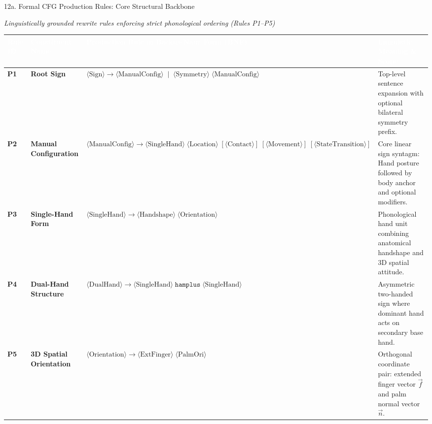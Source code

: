 \documentclass[aspectratio=169,xcolor={table,dvipsnames}]{beamer}
\begin{document}
\begin{frame}[t]{12a. Formal CFG Production Rules: Core Structural Backbone}
\vspace{-0.1cm}
\begin{center}
    \scriptsize\textit{\textcolor{amritaMaroon}{Linguistically grounded rewrite rules enforcing strict phonological ordering (Rules P1--P5)}}
\end{center}

\vspace{-1.5mm}
\centering
\setlength{\tabcolsep}{4pt}
\renewcommand{\arraystretch}{1.28}
{\fontsize{7.2pt}{9.2pt}\selectfont
\begin{tabular}{|>{\centering\arraybackslash\bfseries}p{1.0cm}|>{\raggedright\arraybackslash\bfseries}p{2.6cm}|>{\raggedright\arraybackslash}p{5.8cm}|>{\raggedright\arraybackslash}p{3.2cm}|}
    \hline
    \rowcolor{maroon}
    \textcolor{white}{\textbf{Rule ID}} & 
    \textcolor{white}{\textbf{Constituent Name}} & 
    \textcolor{white}{\textbf{Production Rule in Backus-Naur Form (BNF)}} & 
    \textcolor{white}{\textbf{Linguistic Meaning \& Scope}} \\
    \hline
    \rowcolor{lightblue} 
    \textbf{P1} & Root Sign & 
    $\langle\text{Sign}\rangle \to \langle\text{ManualConfig}\rangle \;\mid\; \langle\text{Symmetry}\rangle \;\langle\text{ManualConfig}\rangle$ & 
    Top-level sentence expansion with optional bilateral symmetry prefix. \\
    \hline
    \rowcolor{lightgreen} 
    \textbf{P2} & Manual Configuration & 
    $\langle\text{ManualConfig}\rangle \to \langle\text{SingleHand}\rangle \;\langle\text{Location}\rangle \;[\langle\text{Contact}\rangle] \;[\langle\text{Movement}\rangle] \;[\langle\text{StateTransition}\rangle]$ & 
    Core linear sign syntagm: Hand posture followed by body anchor and optional modifiers. \\
    \hline
    \rowcolor{lightyellow} 
    \textbf{P3} & Single-Hand Form & 
    $\langle\text{SingleHand}\rangle \to \langle\text{Handshape}\rangle \;\langle\text{Orientation}\rangle$ & 
    Phonological hand unit combining anatomical handshape and 3D spatial attitude. \\
    \hline
    \rowcolor{lightcyan} 
    \textbf{P4} & Dual-Hand Structure & 
    $\langle\text{DualHand}\rangle \to \langle\text{SingleHand}\rangle \;\texttt{hamplus}\; \langle\text{SingleHand}\rangle$ & 
    Asymmetric two-handed sign where dominant hand acts on secondary base hand. \\
    \hline
    \rowcolor{lightorange} 
    \textbf{P5} & 3D Spatial Orientation & 
    $\langle\text{Orientation}\rangle \to \langle\text{ExtFinger}\rangle \;\langle\text{PalmOri}\rangle$ & 
    Orthogonal coordinate pair: extended finger vector $\vec{f}$ and palm normal vector $\vec{n}$. \\
    \hline
\end{tabular}
}


\end{frame}
\end{document}
